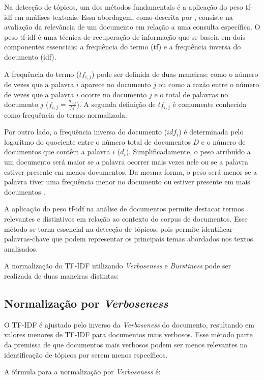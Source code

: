 \documentclass[12pt]{article}
\begin{document}
Na detecção de tópicos, um dos métodos fundamentais é a aplicação do peso tf-idf em análises textuais. Essa abordagem, como descrita por \cite{Benhardus2013}, consiste na avaliação da relevância de um documento em relação a uma consulta específica. O peso tf-idf é uma técnica de recuperação de informação que se baseia em dois componentes essenciais: a frequência do termo (tf) e a frequência inversa do documento (idf).

A frequência do termo ($tf_{i,j}$) pode ser definida de duas maneiras: como o número de vezes que a palavra $i$ aparece no documento $j$ ou como a razão entre o número de vezes que a palavra $i$ ocorre no documento $j$ e o total de palavras no documento $j$ ($f_{i,j} = \frac{n_{i,j}}{M}$). A segunda definição de $tf_{i,j}$ é comumente conhecida como frequência do termo normalizada.

Por outro lado, a frequência inversa do documento ($idf_i$) é determinada pelo logaritmo do quociente entre o número total de documentos $D$ e o número de documentos que contêm a palavra $i$ ($d_i$). Simplificadamente, o peso atribuído a um documento será maior se a palavra ocorrer mais vezes nele ou se a palavra estiver presente em menos documentos. Da mesma forma, o peso será menor se a palavra tiver uma frequência menor no documento ou estiver presente em mais documentos \cite{Hiemstra2000}.

A aplicação do peso tf-idf na análise de documentos permite destacar termos relevantes e distintivos em relação ao contexto do corpus de documentos. Esse método se torna essencial na detecção de tópicos, pois permite identificar palavras-chave que podem representar os principais temas abordados nos textos analisados.

A normalização do TF-IDF utilizando \textit{Verboseness} e \textit{Burstiness} pode ser realizada de duas maneiras distintas:

\subsection{Normalização por \textit{Verboseness}}

O TF-IDF é ajustado pelo inverso da \textit{Verboseness} do documento, resultando em valores menores de TF-IDF para documentos mais verbosos. Esse método parte da premissa de que documentos mais verbosos podem ser menos relevantes na identificação de tópicos por serem menos específicos.

A fórmula para a normalização por \textit{Verboseness} é:
\end{document}
